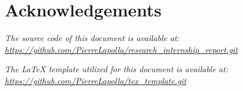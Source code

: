 \maketitle
\tableofcontents


\section*{Acknowledgements}\label{sec:acknowledgements}

\vfill
\begin{center}
    \textit{The source code of this document is available at:
    \url{https://github.com/PierreLapolla/research_internship_report.git}}

    \textit{The \LaTeX{} template utilized for this document is available at:
    \url{https://github.com/PierreLapolla/tex_template.git}}
\end{center}
\newpage